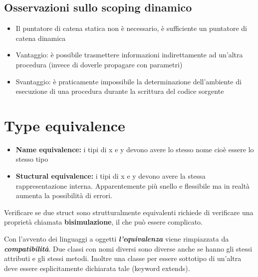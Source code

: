 \documentclass[10pt]{article}
\begin{document}
\subsection{Osservazioni sullo scoping dinamico}
\begin{itemize}
    \item Il puntatore di catena statica non è necessario, è sufficiente un puntatore di catena dinamica
    \item Vantaggio: è possibile trasmettere informazioni indirettamente ad un'altra procedura (invece di doverle propagare con parametri)
    \item Svantaggio: è praticamente impossibile la determinazione dell'ambiente di esecuzione di una procedura durante la scrittura del codice sorgente
\end{itemize}
\section{Type equivalence}
\begin{itemize}
    \item \textbf{Name equivalence:} i tipi di x e y devono avere lo stesso nome cioè essere lo stesso tipo
    \item \textbf{Stuctural equivalence:} i tipi di x e y devono avere la stessa rappresentazione interna. Apparentemente più snello e flessibile ma in realtà aumenta la possibilità di errori.
\end{itemize}
Verificare se due struct sono strutturalmente equivalenti richiede di verificare una proprietà chiamata \textbf{bisimulazione}, il che può essere complicato.

Con l'avvento dei linguaggi a oggetti \textit{\textbf{l'equivalenza}} viene rimpiazzata da \textit{\textbf{compatibilità}}. Due classi con nomi diversi sono diverse anche se hanno gli stessi attributi e gli stessi metodi. Inoltre una classe per essere sottotipo di un'altra deve essere 
esplicitamente dichiarata tale (keyword extends).
\end{document}
